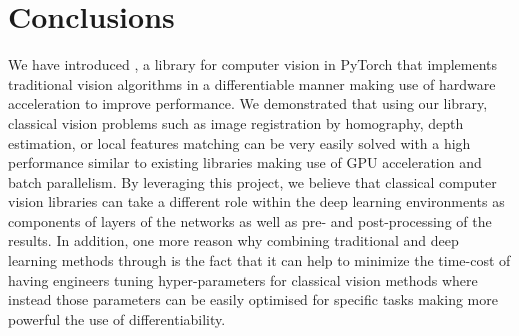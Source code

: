 \section{Conclusions}
We have introduced \lib, a library for computer vision in PyTorch that implements traditional vision algorithms in a differentiable manner making use of hardware acceleration to improve performance. We demonstrated that using our library, classical vision problems such as image registration by homography, depth estimation, or local features matching can be very easily solved with a high performance similar to existing libraries making use of GPU acceleration and batch parallelism. By leveraging this project, we believe that classical computer vision libraries can take a different role within the deep learning environments as components of layers of the networks as well as pre- and post-processing of the results. In addition, one more reason why combining traditional and deep learning methods through \lib{} is the fact that it can help to minimize the time-cost of having engineers tuning hyper-parameters for classical vision methods where instead those parameters can be easily optimised for specific tasks making more powerful the use of differentiability.
